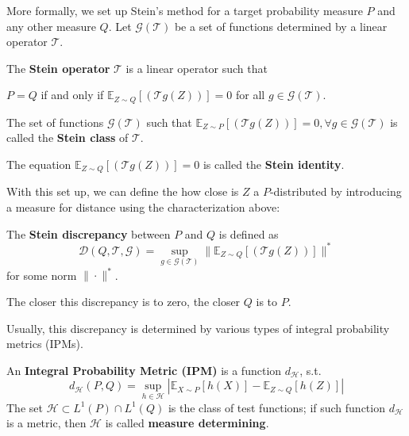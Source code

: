 \documentclass{article}
\begin{document}
More formally, we set up Stein's method for a target probability measure $P$ and any other measure $Q$. Let $\mathcal{G}(\mathcal{T})$ be a set of functions determined by a linear operator $\mathcal{T}$.  

\begin{definition}\label{def:stein_operator}
    The \textbf{Stein operator} $\mathcal{T}$ is a linear operator such that
    \begin{center}
        $P=Q$ if and only if $\mathbb{E}_{Z\sim Q}[(\mathcal{T}g(Z))]=0$ for all $g \in \mathcal{G}(\mathcal{T})$.
    \end{center}
    The set of functions $\mathcal{G}(\mathcal{T})$ such that $\mathbb{E}_{Z \sim P}[(\mathcal{T}g(Z))]=0, \forall g \in \mathcal{G}(\mathcal{T})$ is called the \textbf{Stein class} of $\mathcal{T}$.
\end{definition}

The equation $\mathbb{E}_{Z\sim Q}[(\mathcal{T}g(Z))]=0$ is called the \textbf{Stein identity}.  

With this set up, we can define the how close is $Z$ a $P$-distributed by introducing a measure for distance using the characterization above:

\begin{definition}
    The \textbf{Stein discrepancy} between $P$ and $Q$ is defined as\label{def:stein_discrepancy}
    \begin{equation*}
        \mathcal{D}(Q, \mathcal{T}, \mathcal{G})=\sup_{g \in \mathcal{G}(\mathcal{T})} \|\mathbb{E}_{Z\sim Q}[(\mathcal{T}g(Z))]\|^*
    \end{equation*}
    for some norm $\|\cdot\|^*$.
\end{definition}

The closer this discrepancy is to zero, the closer $Q$ is to $P$. 

Usually, this discrepancy is determined by various types of integral probability metrics (IPMs).

\begin{definition}\label{def:ipm}
    An \textbf{Integral Probability Metric (IPM)} is a function $d_{\mathcal{H}}$, s.t. 
    \begin{equation*}
        d_\mathcal{H}(P, Q) = \sup_{h \in \mathcal{H}} |\mathbb{E}_{X\sim P}[h(X)] - \mathbb{E}_{Z\sim Q}[h(Z)]|
    \end{equation*}
    The set $\mathcal{H} \subset L^1(P) \cap L^1(Q)$ is the class of test functions; if such function $d_\mathcal{H}$ is a metric, then $\mathcal{H}$ is called \textbf{measure determining}.
\end{definition}
\end{document}
